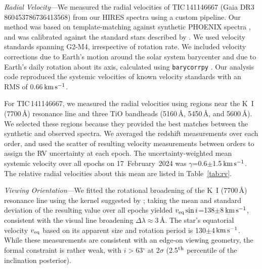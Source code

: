 \documentclass[11pt,twocolumn,tighten]{aastex7}
\newcommand{\kms}{\ensuremath{\rm km\,s^{-1}}}
\begin{document}
{\it Radial Velocity}---We measured the radial velocities of
TIC\,141146667 (Gaia DR3 860453786736413568) from our HIRES
spectra using a custom pipeline.  Our method was based on
template-matching against synthetic PHOENIX spectra
\citep{Husser2013}, and was calibrated against the
standard stars described by \citet{Chubak2012}.  We used velocity
standards spanning G2-M4, irrespective of rotation rate.  We included
velocity corrections due to Earth's motion around the solar system
barycenter and due to Earth's daily rotation about its axis,
calculated using \texttt{barycorrpy} \citep{Kanodia2018}.  Our
analysis code reproduced the systemic velocities of known velocity
standards \citep{Chubak2012} with an RMS of 0.66\,\kms.

For TIC\,141146667, we measured the radial velocities using regions
near the K~I (7700\,\AA) resonance line and three TiO bandheads
(5160\,\AA, 5450\,\AA, and 5600\,\AA).  We selected these regions
because they provided the best matches between the synthetic and
observed spectra.  We averaged the redshift measurements over each
order, and used the scatter of resulting velocity measurements between
orders to assign the RV uncertainty at each epoch.  The
uncertainty-weighted mean systemic velocity over all epochs on
17~February~2024 was $\gamma$=0.6$\pm$1.5\,\kms.  The relative radial
velocities about this mean are listed in Table~\ref{tab:rv}.

{\it Viewing Orientation}---We fitted the rotational broadening of the
K~I (7700\,\AA) resonance line using the kernel suggested by
\citet{Gray2008}; taking the mean and standard deviation of the
resulting value over all epochs yielded $v_{\rm eq} \sin
i$=138$\pm$8\,\kms, consistent with the visual line broadening $\Delta
\lambda$$\approx$3\,\AA.  The star's equatorial velocity $v_{\rm eq}$
based on its apparent size and rotation period is 130$\pm$4\,\kms.
While these measurements are consistent with an edge-on viewing
geometry, the formal constraint is rather weak, with $i$$>$63$^\circ$
at 2$\sigma$ (2.5$^{\rm th}$ percentile of the inclination posterior).

\end{document}
